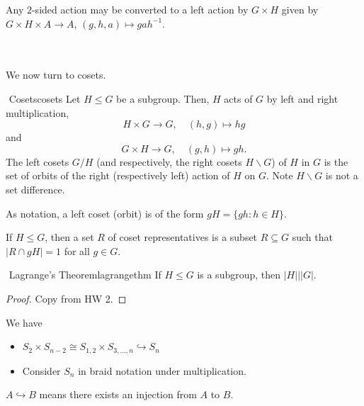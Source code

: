         \begin{remark*}
            Any \(2\)-sided action may be converted to a left action by \(G\times H\) given by \(G\times H\times A\to A\), \((g,h,a)\mapsto gah^{-1}\).
        \end{remark*}
        \pagebreak
        \vphantom
        \\
        \\
        We now turn to cosets. 
        \begin{definition}{\Stop\,\,Cosets}{cosets}
            Let \(H\leq G\) be a subgroup. Then, \(H\) acts of \(G\) by left and right multiplication,
            \begin{equation*}
                H\times G\to G,\quad (h,g)\mapsto hg
            \end{equation*}
            and 
            \begin{equation*}
                G\times H\to G,\quad (g,h)\mapsto gh.
            \end{equation*}
            The left cosets \(G/H\) (and respectively, the right cosets \(H\backslash G\)) of \(H\) in \(G\) is the set of orbits of the right (respectively left) action of \(H\) on \(G\). Note \(H\backslash G\) is not a set difference.
        \end{definition}
        \begin{remark*}
            As notation, a left coset (orbit) is of the form \(gH=\{gh:h\in H\}\).
        \end{remark*}
        \begin{remark*}
            If \(H\leq G\), then a set \(R\) of coset representatives is a subset \(R\subseteq G\) such that \(|R\cap gH|=1\) for all \(g\in G\).
        \end{remark*}
        \begin{corollary}{\Stop\,\,Lagrange's Theorem}{lagrangethm}
            If \(H\leq G\) is a subgroup, then \(|H|||G|\).
            \begin{proof}
                Copy from HW 2.
                \DOTHISLATER
            \end{proof}
        \end{corollary}
        \begin{example}
            We have
            \begin{itemize}
                \item \(S_2\times S_{n-2}\cong S_{1,2}\times S_{3,\ldots, n}\hookrightarrow S_n\)
                \item Consider \(S_n\) in braid notation under multiplication.
            \end{itemize}
        \end{example}
        \begin{remark*}
            \(A\hookrightarrow B\) means there exists an injection from \(A\) to \(B\).
        \end{remark*}